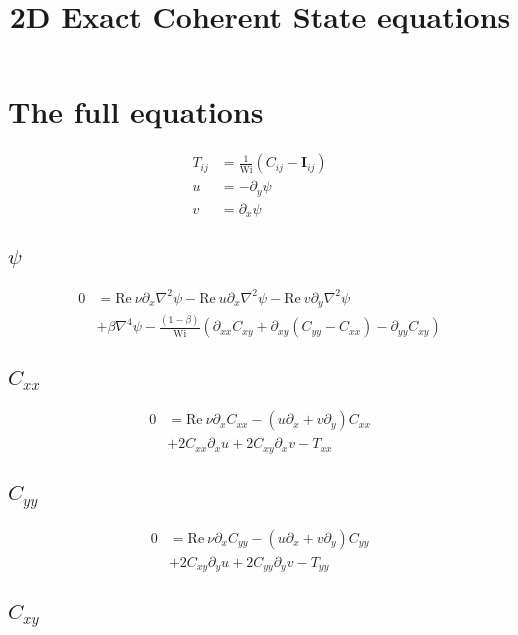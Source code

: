 \documentclass[12,a4paper]{article}
\newcommand{\dd}[1]{\partial_{#1}}
\newcommand{\lpl}{\nabla^{2}}
\newcommand{\bih}{\nabla^{4}}
\newcommand{\Wi}{\mathrm{Wi}}
\newcommand{\Rey}{\mathrm{Re \ }}
\newcommand{\II}{\mathbf{I}}
\begin{document}
\title{2D Exact Coherent State equations}
\maketitle

\section{The full equations}
\begin{align}
    T_{ij} &= \frac{1}{\Wi} (C_{ij} - \II_{ij}) \\
    u	   &= -\dd{y} \psi \\
    v	   &= \dd{x} \psi
\end{align}

\subsection{$\psi$}

\begin{align}
    0 &= \Rey\nu\dd{x}\lpl\psi - \Rey u \dd{x} \lpl \psi - \Rey v \dd{y} \lpl \psi \nonumber\\
      &+ \beta \bih \psi - \frac{(1-\beta)}{\Wi} \left( \dd{xx} C_{xy} + \dd{xy}(C_{yy} - C_{xx}) - \dd{yy} C_{xy}\right)
\end{align}

\subsection{$C_{xx}$}

\begin{align}
    0 &= \Rey \nu \dd{x} C_{xx} - (u\dd{x} + v\dd{y}) C_{xx} \nonumber\\
      &+ 2C_{xx}\dd{x}u + 2C_{xy}\dd{x}v -  T_{xx}
\end{align}

\subsection{$C_{yy}$}

\begin{align}
    0 &= \Rey \nu \dd{x} C_{yy} - (u\dd{x} + v\dd{y}) C_{yy} \nonumber\\
    &+ 2C_{xy} \dd{y}u + 2C_{yy}\dd{y}v - T_{yy}
\end{align}

\subsection{$C_{xy}$}
\end{document}
